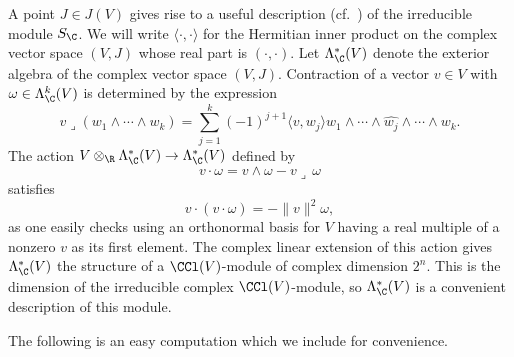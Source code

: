 A point $J \in J(V)$ gives rise to a useful description (cf.~\cite[Chapter I, equation~(5.27)]{LM})
of the irreducible module $S_\C$.
We will write $\langle \cdot, \cdot \rangle$ for the Hermitian inner product on the complex vector space $(V,J)$ whose real part is $ (\cdot, \cdot )$.
Let $\Lambda_\C^*(V)$ denote the exterior algebra of the complex vector space $(V,J)$.
Contraction of a vector $v \in V$ with $\omega \in \Lambda_\C^k(V)$ is determined by the expression
\[
v \lrcorner (w_1 \wedge \cdots \wedge w_k) = \sum_{j=1}^k (-1)^{j+1}\langle v, w_j \rangle w_1 \wedge \cdots \wedge \widehat{w_j} \wedge \cdots \wedge w_k.
\]
The action $V \otimes_\R \Lambda_\C^*(V) \to \Lambda_\C^*(V)$ defined by
\begin{equation*}
v \cdot \omega = v \wedge \omega - v \lrcorner \, \omega
\end{equation*}
satisfies
\begin{equation*}
v\cdot(v \cdot \omega) = - \|v\|^2 \omega,
\end{equation*}
as one easily checks using an orthonormal basis for $V$ having a
real multiple of a nonzero $v$ as its first element. The complex linear extension of this action gives $\Lambda_\C^*(V)$ the structure of a $\CCl(V)$-module of complex dimension $2^n$. This is the dimension of the irreducible complex $\CCl(V)$-module, so $\Lambda_\C^*(V)$ is a convenient description of this module.

The following is an easy computation which we include for convenience.

